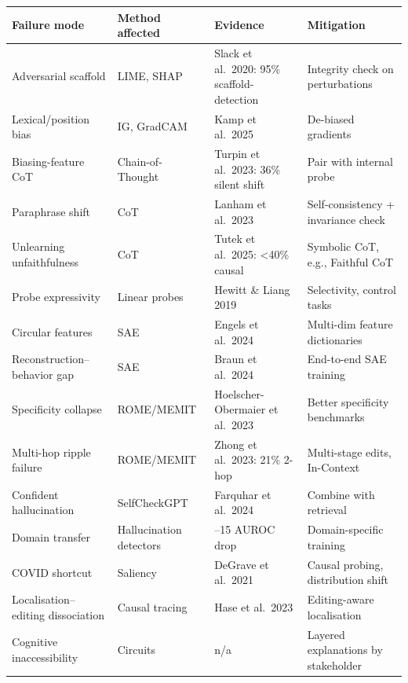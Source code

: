 {\def\LTcaptype{none} %
\begin{longtable}[]{@{}
  >{\raggedright\arraybackslash}p{}
  >{\raggedright\arraybackslash}p{}
  >{\raggedright\arraybackslash}p{}
  >{\raggedright\arraybackslash}p{}@{}}
\toprule\noalign{}
\begin{minipage}[b]{\linewidth}\raggedright
Failure mode
\end{minipage} & \begin{minipage}[b]{\linewidth}\raggedright
Method affected
\end{minipage} & \begin{minipage}[b]{\linewidth}\raggedright
Evidence
\end{minipage} & \begin{minipage}[b]{\linewidth}\raggedright
Mitigation
\end{minipage} \\
\midrule\noalign{}
\endhead
\bottomrule\noalign{}
\endlastfoot
Adversarial scaffold & LIME, SHAP & Slack et al.~2020: 95\% scaffold-detection & Integrity check on perturbations \\
Lexical/position bias & IG, GradCAM & Kamp et al.~2025 & De-biased gradients \\
Biasing-feature CoT & Chain-of-Thought & Turpin et al.~2023: 36\% silent shift & Pair with internal probe \\
Paraphrase shift & CoT & Lanham et al.~2023 & Self-consistency + invariance check \\
Unlearning unfaithfulness & CoT & Tutek et al.~2025: \textless40\% causal & Symbolic CoT, e.g., Faithful CoT \\
Probe expressivity & Linear probes & Hewitt \& Liang 2019 & Selectivity, control tasks \\
Circular features & SAE & Engels et al.~2024 & Multi-dim feature dictionaries \\
Reconstruction--behavior gap & SAE & Braun et al.~2024 & End-to-end SAE training \\
Specificity collapse & ROME/MEMIT & Hoelscher-Obermaier et al.~2023 & Better specificity benchmarks \\
Multi-hop ripple failure & ROME/MEMIT & Zhong et al.~2023: 21\% 2-hop & Multi-stage edits, In-Context \\
Confident hallucination & SelfCheckGPT & Farquhar et al.~2024 & Combine with retrieval \\
Domain transfer & Hallucination detectors & 8--15 AUROC drop & Domain-specific training \\
COVID shortcut & Saliency & DeGrave et al.~2021 & Causal probing, distribution shift \\
Localisation--editing dissociation & Causal tracing & Hase et al.~2023 & Editing-aware localisation \\
Cognitive inaccessibility & Circuits & n/a & Layered explanations by stakeholder \\
\end{longtable}
}

